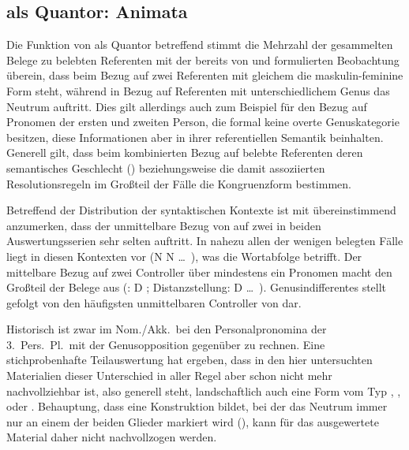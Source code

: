 \subsection{ als Quantor: Animata}

Die Funktion von  als Quantor betreffend stimmt die Mehrzahl der
gesammelten Belege zu belebten Referenten mit der bereits von
\citet[312]{grimm1890} und \citet[39--41]{behaghel1928} formulierten
Beobachtung überein, dass beim Bezug auf zwei Referenten mit gleichem
 die maskulin-feminine Form steht, während in Bezug auf Referenten
mit unterschiedlichem Genus das Neutrum auftritt. Dies gilt allerdings
auch zum Beispiel für den Bezug auf Pronomen der ersten und zweiten Person, die
formal keine overte Genuskategorie besitzen, diese
Informationen aber in ihrer referentiellen Semantik beinhalten. Generell gilt,
dass beim kombinierten Bezug auf belebte Referenten deren semantisches
Geschlecht () beziehungsweise die damit assoziierten
Resolutionsregeln im Großteil der Fälle die Kongruenzform bestimmen.

Betreffend der Distribution der syntaktischen
Kontexte ist mit \citet[624, Abbildung
P~179]{ksw2} übereinstimmend anzumerken, dass der unmittelbare
Bezug von  auf zwei  in beiden Auswertungsserien
sehr selten auftritt. In nahezu allen der wenigen belegten Fälle liegt in
diesen Kontexten  vor (N  N
\dots\ ), was die Wortabfolge betrifft. Der mittelbare
Bezug auf zwei Controller über mindestens ein Pronomen macht den Großteil der
Belege aus (: D ; Distanzstellung:
D \dots\ ). Genus\-indifferentes
  stellt gefolgt von   den häufigsten
unmittelbaren Controller von  dar.

Historisch ist zwar im Nom./Akk.\ bei den
Personalpronomina der 3.~Pers.\ Pl.\ mit der
Genus\-opposition   gegenüber 
 zu rechnen. Eine stichprobenhafte
Teilauswertung hat ergeben, dass in den hier untersuchten Materialien dieser
Unterschied in aller Regel aber schon nicht mehr nachvollziehbar ist, also
generell  steht, landschaftlich auch eine Form vom Typ
,
,
 oder
\autocites[vgl.]%
	[482--483]{wmu1}%
	[213--214]{paul2007}%
	[369, 390--397]{ksw2}. %
 Behauptung, dass  eine
Konstruktion bildet, bei der das Neutrum immer nur an einem der beiden Glieder
markiert wird (), kann für das ausgewertete Material daher
nicht nachvollzogen werden.


